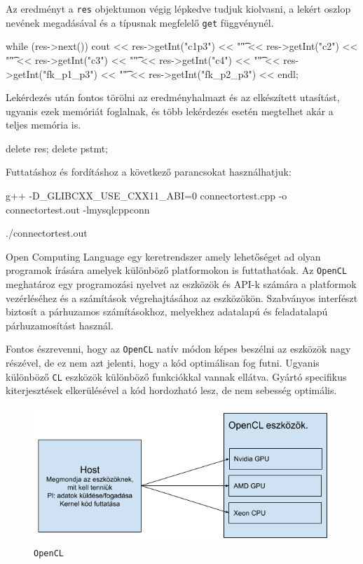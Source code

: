 Az eredményt a \texttt{res} objektumon végig lépkedve tudjuk kiolvasni, a lekért oszlop nevének megadásával és a típusnak megfelelő \texttt{get} függvénynél.
\begin{cpp}
 while (res->next())
      cout << res->getInt("c1p3") << "\t" << res->getInt("c2") << "\t"
           << res->getInt("c3") << "\t" << res->getInt("c4") << "\t"
           << res->getInt("fk_p1_p3") << "\t" << res->getInt("fk_p2_p3") 
           << endl;
\end{cpp}
Lekérdezés után fontos törölni az eredményhalmazt és az elkészített utasítást, ugyanis ezek memóriát foglalnak, és több lekérdezés esetén megtelhet akár a teljes memória is.
\begin{cpp}
    delete res;
    delete pstmt;
\end{cpp}
Futtatáshoz és fordításhoz a következő parancsokat használhatjuk: 
\begin{python}
g++ -D_GLIBCXX_USE_CXX11_ABI=0 connectortest.cpp -o connectortest.out 
-lmysqlcppconn

./connectortest.out
\end{python}



Open Computing Language egy keretrendszer amely lehetőséget ad olyan programok írására amelyek különböző platformokon is futtathatóak.
Az \texttt{OpenCL} meghatároz egy programozási nyelvet az eszközök és API-k számára a platformok vezérléséhez és a számítások végrehajtásához az eszközökön. Szabványos interfészt biztosít a párhuzamos számításokhoz, melyekhez adatalapú és feladatalapú párhuzamosítást használ.

Fontos észrevenni, hogy az \texttt{OpenCL} natív módon képes beszélni az eszközök nagy részével, de ez nem azt jelenti, hogy a kód optimálisan fog futni. Ugyanis különböző \texttt{CL} eszközök különböző funkciókkal vannak ellátva. Gyártó specifikus kiterjesztések elkerülésével a kód hordozható lesz, de nem sebesség optimális.

\begin{figure}[h!]
\centering
\includegraphics[width=\textwidth]{images/opencl.png}
\caption{\texttt{OpenCL}}
\label{fig:opencl}
\end{figure}

